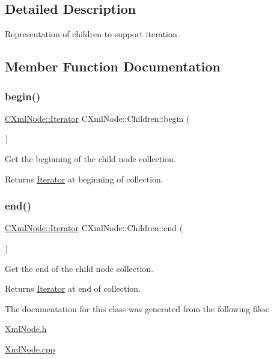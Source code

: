 \subsection{Detailed Description}
Representation of children to support iteration. 

\subsection{Member Function Documentation}
\mbox{\label{classxmlnode_1_1_c_xml_node_1_1_children_a8f0cac16fdda64bbf10cb08eba606dd1}} 
\subsubsection{\texorpdfstring{begin()}{begin()}}
{\footnotesize\ttfamily \mbox{\hyperlink{classxmlnode_1_1_c_xml_node_1_1_iterator}{C\+Xml\+Node\+::\+Iterator}} C\+Xml\+Node\+::\+Children\+::begin (\begin{DoxyParamCaption}{ }\end{DoxyParamCaption})}



Get the beginning of the child node collection. 

\begin{DoxyReturn}{Returns}
\mbox{\hyperlink{classxmlnode_1_1_c_xml_node_1_1_iterator}{Iterator}} at beginning of collection. 
\end{DoxyReturn}
\mbox{\label{classxmlnode_1_1_c_xml_node_1_1_children_a3fe6fb9e62c63d6a9ea46653608d42e8}} 
\subsubsection{\texorpdfstring{end()}{end()}}
{\footnotesize\ttfamily \mbox{\hyperlink{classxmlnode_1_1_c_xml_node_1_1_iterator}{C\+Xml\+Node\+::\+Iterator}} C\+Xml\+Node\+::\+Children\+::end (\begin{DoxyParamCaption}{ }\end{DoxyParamCaption})}



Get the end of the child node collection. 

\begin{DoxyReturn}{Returns}
\mbox{\hyperlink{classxmlnode_1_1_c_xml_node_1_1_iterator}{Iterator}} at end of collection. 
\end{DoxyReturn}


The documentation for this class was generated from the following files\+:\begin{DoxyCompactItemize}
\item 
\mbox{\hyperlink{_xml_node_8h}{Xml\+Node.\+h}}\item 
\mbox{\hyperlink{_xml_node_8cpp}{Xml\+Node.\+cpp}}\end{DoxyCompactItemize}
